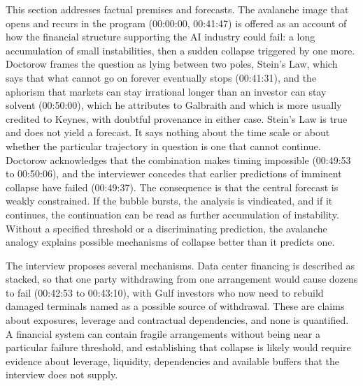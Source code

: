 \documentclass[12pt]{article}
\newcommand{\ts}[1]{(#1)}
\begin{document}
This section addresses factual premises and forecasts. The avalanche image that opens and recurs in the program \ts{00:00:00, 00:41:47} is offered as an account of how the financial structure supporting the AI industry could fail: a long accumulation of small instabilities, then a sudden collapse triggered by one more. Doctorow frames the question as lying between two poles, Stein's Law, which says that what cannot go on forever eventually stops \ts{00:41:31}, and the aphorism that markets can stay irrational longer than an investor can stay solvent \ts{00:50:00}, which he attributes to Galbraith and which is more usually credited to Keynes, with doubtful provenance in either case. Stein's Law is true and does not yield a forecast. It says nothing about the time scale or about whether the particular trajectory in question is one that cannot continue. Doctorow acknowledges that the combination makes timing impossible \ts{00:49:53 to 00:50:06}, and the interviewer concedes that earlier predictions of imminent collapse have failed \ts{00:49:37}. The consequence is that the central forecast is weakly constrained. If the bubble bursts, the analysis is vindicated, and if it continues, the continuation can be read as further accumulation of instability. Without a specified threshold or a discriminating prediction, the avalanche analogy explains possible mechanisms of collapse better than it predicts one.

The interview proposes several mechanisms. Data center financing is described as stacked, so that one party withdrawing from one arrangement would cause dozens to fail \ts{00:42:53 to 00:43:10}, with Gulf investors who now need to rebuild damaged terminals named as a possible source of withdrawal. These are claims about exposures, leverage and contractual dependencies, and none is quantified. A financial system can contain fragile arrangements without being near a particular failure threshold, and establishing that collapse is likely would require evidence about leverage, liquidity, dependencies and available buffers that the interview does not supply.
\end{document}

